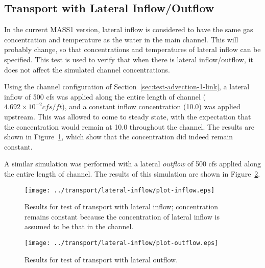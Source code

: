 \documentclass[12pt,dvips,letterpaper]{article}
\begin{document}
\subsection{Transport with Lateral Inflow/Outflow}
\label{sec:test-transport-lateral}

In the current MASS1 version, lateral inflow is considered to have the
same gas concentration and temperature as the water in the main
channel.  This will probably change, so that concentrations and
temperatures of lateral inflow can be specified.  This test is used to
verify that when there is lateral inflow/outflow, it does not affect
the simulated channel concentrations.  

Using the channel configuration of
Section~\ref{sec:test-advection-1-link}, a lateral inflow of 500 cfs
was applied along the entire length of channel ($4.692 \times 10^{-2}
cfs/ft$), and a constant inflow concentration (10.0) was applied
upstream.  This was allowed to come to steady state, with the
expectation that the concentration would remain at 10.0 throughout the
channel.  The results are shown in
Figure~\ref{fig:test-tranport-lateral-inflow}, which show that the
concentration did indeed remain constant. 

A similar simulation was performed with a lateral \textit{outflow} of
500 cfs applied along the entire length of channel.  The results of
this simulation are shown in
Figure~\ref{fig:test-tranport-lateral-outflow}.

\begin{figure}[htbp]
  \begin{center}
    \texttt{[image: ../transport/lateral-inflow/plot-inflow.eps]}
    \caption{Results for test of transport with lateral inflow;
      concentration remains constant because the concentration of
      lateral inflow is assumed to be that in the channel.} 
    \label{fig:test-tranport-lateral-inflow}
  \end{center}
\end{figure}

\begin{figure}[htbp]
  \begin{center}
    \texttt{[image: ../transport/lateral-inflow/plot-outflow.eps]}
    \caption{Results for test of transport with lateral outflow.} 
    \label{fig:test-tranport-lateral-outflow}
  \end{center}
\end{figure}

\end{document}
